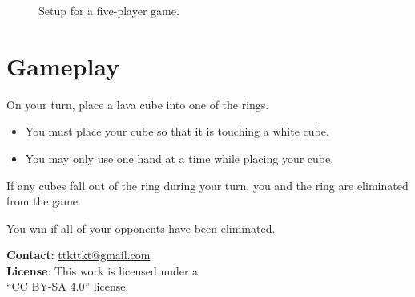 \documentclass[parskip=half]{scrartcl}
\begin{document}
\vfill

\begin{figure}[hb]
\centering
\caption*{{\scriptsize Setup for a five-player game.}}
\end{figure}
\newpage
\section*{Gameplay}
On your turn, place a lava cube into one of the rings.
\begin{itemize}[leftmargin=*]
\item You must place your cube so that it is touching a white cube.
\item You may only use one hand at a time while placing your cube.
\end{itemize}

If any cubes fall out of the ring during your turn, you and the ring are eliminated from the game.

You win if all of your opponents have been eliminated.

\vfill

\scriptsize
\textbf{Contact}: \href{mailto:ttkttkt@gmail.com}{ttkttkt@gmail.com}\\
\textbf{License}: This work is licensed under a\\``CC BY-SA 4.0'' license.%
 
\end{document}

